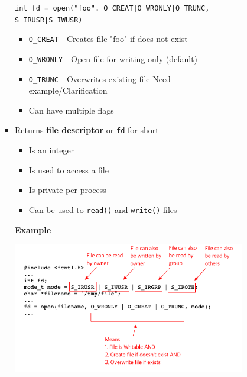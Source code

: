 \documentclass[12pt]{article}
\begin{document}
\begin{enumerate}[1.]
\begin{enumerate}[a)]
\begin{itemize}
\begin{itemize}
\begin{itemize}
                    \bigskip

                    \texttt{int fd = open("foo". O\_CREAT|O\_WRONLY|O\_TRUNC, S\_IRUSR|S\_IWUSR)}

                    \bigskip

                    \begin{itemize}
                        \item \texttt{O\_CREAT} - Creates file "foo" if does not exist
                        \item \texttt{O\_WRONLY} - Open file for writing only (default)
                        \item \texttt{O\_TRUNC} - Overwrites existing file \color{red}Need example/Clarification\color{black}
                        \item Can have multiple flags
                    \end{itemize}
                    \item Returns \textbf{file descriptor} or \texttt{fd} for short

                    \begin{itemize}
                        \item Is an integer
                        \item Is used to access a file
                        \item Is \underline{private} per process
                        \item Can be used to \texttt{read()} and \texttt{write()} files
                    \end{itemize}

                    \bigskip

                    \underline{\textbf{Example}}

                    \bigskip

                    \begin{center}
                    \includegraphics[width=\linewidth]{../images/midterm_4_solution_2.png}
                    \end{center}
                \end{itemize}


\end{itemize}
\end{itemize}
\end{enumerate}
\end{enumerate}
\end{document}
